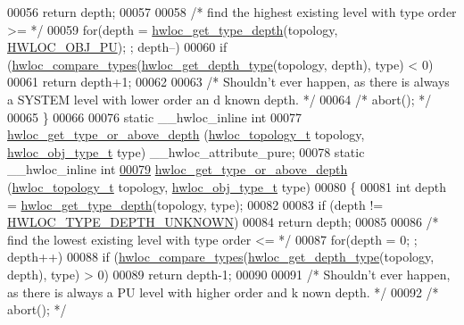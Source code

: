 \begin{DoxyCode}
00056     \textcolor{keywordflow}{return} depth;
00057 
00058   \textcolor{comment}{/* find the highest existing level with type order >= */}
00059   \textcolor{keywordflow}{for}(depth = \hyperlink{a00046_gaea7c64dd59467f5201ba87712710b14d}{hwloc_get_type_depth}(topology, \hyperlink{a00041_ggacd37bb612667dc437d66bfb175a8dc55abca6887e80cb291353b0a0c1da83f661}{HWLOC_OBJ_PU}); ; depth--)
00060     \textcolor{keywordflow}{if} (\hyperlink{a00041_gabd7da4f4ea12b420b8ecbde458b27805}{hwloc_compare_types}(\hyperlink{a00046_gadd4964764ae7e49231065d58a553fd31}{hwloc_get_depth_type}(topology, depth), type) < 0)
00061       \textcolor{keywordflow}{return} depth+1;
00062 
00063   \textcolor{comment}{/* Shouldn't ever happen, as there is always a SYSTEM level with lower order an
      d known depth.  */}
00064   \textcolor{comment}{/* abort(); */}
00065 \}
00066 
00076 \textcolor{keyword}{static} \_\_hwloc\_inline \textcolor{keywordtype}{int}
00077 \hyperlink{a00052_ga62a3f401854c209605c90079700f4bc5}{hwloc_get_type_or_above_depth} (\hyperlink{a00039_ga9d1e76ee15a7dee158b786c30b6a6e38}{hwloc_topology_t} topology, \hyperlink{a00041_gacd37bb612667dc437d66bfb175a8dc55}{hwloc_obj_type_t} type) 
      \_\_hwloc\_attribute\_pure;
00078 \textcolor{keyword}{static} \_\_hwloc\_inline \textcolor{keywordtype}{int}
\hypertarget{a00031_source_l00079}{}\hyperlink{a00052_ga62a3f401854c209605c90079700f4bc5}{00079} \hyperlink{a00052_ga62a3f401854c209605c90079700f4bc5}{hwloc_get_type_or_above_depth} (\hyperlink{a00039_ga9d1e76ee15a7dee158b786c30b6a6e38}{hwloc_topology_t} topology, \hyperlink{a00041_gacd37bb612667dc437d66bfb175a8dc55}{hwloc_obj_type_t} type)
00080 \{
00081   \textcolor{keywordtype}{int} depth = \hyperlink{a00046_gaea7c64dd59467f5201ba87712710b14d}{hwloc_get_type_depth}(topology, type);
00082 
00083   \textcolor{keywordflow}{if} (depth != \hyperlink{a00046_ggaf4e663cf42bbe20756b849c6293ef575a0565ab92ab72cb0cec91e23003294aad}{HWLOC_TYPE_DEPTH_UNKNOWN})
00084     \textcolor{keywordflow}{return} depth;
00085 
00086   \textcolor{comment}{/* find the lowest existing level with type order <= */}
00087   \textcolor{keywordflow}{for}(depth = 0; ; depth++)
00088     \textcolor{keywordflow}{if} (\hyperlink{a00041_gabd7da4f4ea12b420b8ecbde458b27805}{hwloc_compare_types}(\hyperlink{a00046_gadd4964764ae7e49231065d58a553fd31}{hwloc_get_depth_type}(topology, depth), type) > 0)
00089       \textcolor{keywordflow}{return} depth-1;
00090 
00091   \textcolor{comment}{/* Shouldn't ever happen, as there is always a PU level with higher order and k
      nown depth.  */}
00092   \textcolor{comment}{/* abort(); */}

\end{DoxyCode}
